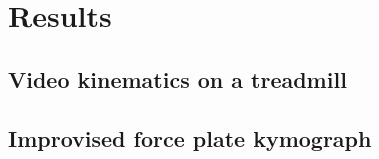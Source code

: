 \section{Results}
\subsection{Video kinematics on a treadmill}
\subsection{Improvised force plate kymograph}

